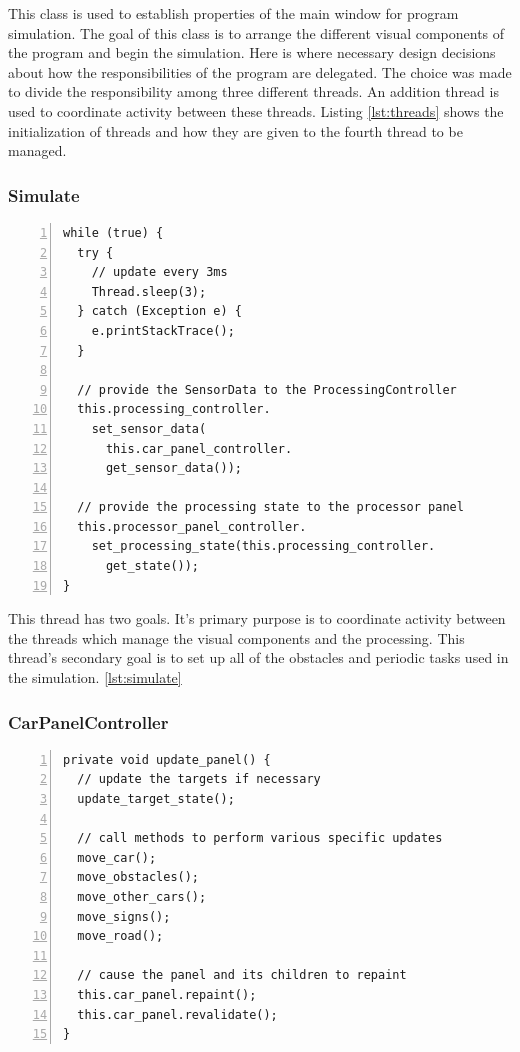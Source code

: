 \documentclass{article} %
\begin{document}
This class is used to establish properties of the main window for program simulation.
The goal of this class is to arrange the different visual components of the program and begin the simulation.
Here is where necessary design decisions about how the responsibilities of the program are delegated.
The choice was made to divide the responsibility among three different threads. An addition thread is used to coordinate activity between these threads.
Listing \ref{lst:threads} shows the initialization of threads and how they are given to the fourth thread to be managed.

\subsubsection{Simulate}
\begin{lstlisting}[caption={Simulate Update Procedure},label={lst:simulate},numbers=left]
while (true) {
  try {
    // update every 3ms
    Thread.sleep(3);
  } catch (Exception e) {
    e.printStackTrace();
  }

  // provide the SensorData to the ProcessingController
  this.processing_controller.
    set_sensor_data(
      this.car_panel_controller.
      get_sensor_data());

  // provide the processing state to the processor panel
  this.processor_panel_controller.
    set_processing_state(this.processing_controller.
      get_state());
}
\end{lstlisting}


This thread has two goals. It's primary purpose is to coordinate activity between the threads which manage the visual components and the processing.
This thread's secondary goal is to set up all of the obstacles and periodic tasks used in the simulation.
\ref{lst:simulate}

\subsubsection{CarPanelController}
\begin{lstlisting}[caption={Panel Update Procedure},label={lst:carpanelcontroller},numbers=left]
private void update_panel() {
  // update the targets if necessary
  update_target_state();

  // call methods to perform various specific updates
  move_car();
  move_obstacles();
  move_other_cars();
  move_signs();
  move_road();

  // cause the panel and its children to repaint
  this.car_panel.repaint();
  this.car_panel.revalidate();
}
\end{lstlisting}
\end{document}
